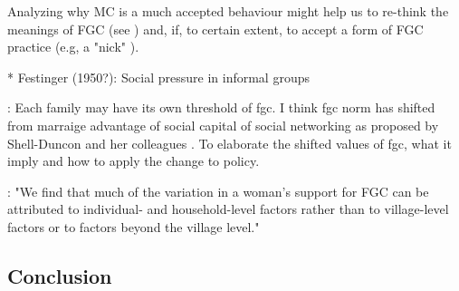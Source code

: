 \documentclass[12pt,]{article}
\begin{document}
Analyzing why MC is a much accepted behaviour might help us to re-think the meanings of FGC (see \cite{DarbSvob07}) and, if, to certain extent, to accept a form of FGC practice (e.g, a "nick" \cite{Wade11}).



 * Festinger (1950?):  Social pressure in informal groups


\cite{EffeVoge15}:  Each family may have its own threshold of fgc. I think fgc norm has shifted from marraige advantage of social capital of social networking as proposed by Shell-Duncon and her colleagues \cite{ShelWand11}.  To elaborate the shifted values of fgc, what it imply and how to apply the change to policy.


\cite{BellNova15}: "We find that much of the variation in a woman's support for FGC can be attributed to individual- and household-level factors rather than to village-level factors or to factors beyond the village level."

\subsection{Conclusion}\label{Conclusion}
\end{document}

